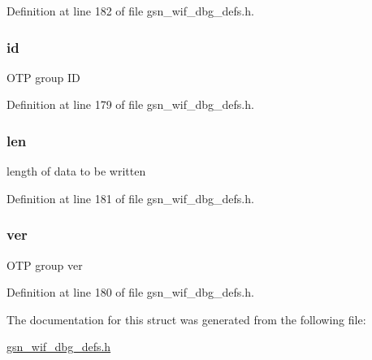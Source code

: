 Definition at line 182 of file gsn\_\-wif\_\-dbg\_\-defs.h.

\hypertarget{a00332_a583a14d715339a2c22d205223d366263}{
\subsubsection[{id}]{ {\bf id}}}
\label{a00332_a583a14d715339a2c22d205223d366263}
OTP group ID 

Definition at line 179 of file gsn\_\-wif\_\-dbg\_\-defs.h.

\hypertarget{a00332_ab3bcead9c261261394a5d9b3bf8f95cb}{
\subsubsection[{len}]{ {\bf len}}}
\label{a00332_ab3bcead9c261261394a5d9b3bf8f95cb}
length of data to be written 

Definition at line 181 of file gsn\_\-wif\_\-dbg\_\-defs.h.

\hypertarget{a00332_a2ac44d771c9e31ef7508150a7082e8cf}{
\subsubsection[{ver}]{ {\bf ver}}}
\label{a00332_a2ac44d771c9e31ef7508150a7082e8cf}
OTP group ver 

Definition at line 180 of file gsn\_\-wif\_\-dbg\_\-defs.h.



The documentation for this struct was generated from the following file:\begin{DoxyCompactItemize}
\item 
\hyperlink{a00609}{gsn\_\-wif\_\-dbg\_\-defs.h}\end{DoxyCompactItemize}
